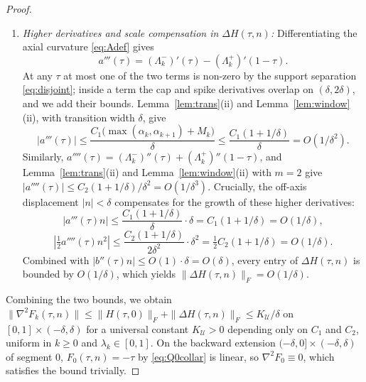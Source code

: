 \documentclass[11pt]{article}
\newcommand{\ip}[2]{\langle #1,#2\rangle}
\begin{document}
\begin{proof}
\begin{enumerate}
\[\]
everywhere on $[0, 1]$ (as $\alpha_{k+1}\le1$ by \eqref{eq:alphak}).
For the transverse tilt, since $g_k, g_{k+1}$, and $\nu_k$ are unit vectors, $|\ip{g_k}{\nu_k}|\le1$ and $|\ip{g_{k+1}}{\nu_k}|\le1$.
The transition in \eqref{eq:btrans} spans $[\delta, 1-\delta]$ of length $1-2\delta\ge9/10$, so by Lemma~\ref{lem:trans}(ii),
\[
|b'(\tau)| \le \frac{2C_1}{1-2\delta} \le \frac{20}{9}C_1 = O(1), \qquad
|b''(\tau)| \le \frac{2C_2}{(1-2\delta)^2} \le \frac{200}{81}C_2 = O(1).
\]
Consequently, the on-axis Hessian satisfies
\[
\|H(\tau, 0)\|_F \le \sqrt{2a''(\tau)^2 + 2b'(\tau)^2} \le \sqrt{2}/\delta + O(1) = O(1/\delta).
\]

\item \emph{Higher derivatives and scale compensation in $\Delta H(\tau, n)$:}
Differentiating the axial curvature \eqref{eq:Adef} gives
\[
a'''(\tau) = (\Lambda_k^-)'(\tau) - (\Lambda_k^+)'(1-\tau).
\]
At any $\tau$ at most one of the two terms is non-zero by the support separation \eqref{eq:disjoint}; inside a term the cap and spike derivatives overlap on $(\delta, 2\delta)$, and we add their bounds. Lemma~\ref{lem:trans}(ii) and Lemma~\ref{lem:window}(ii), with transition width $\delta$, give
\[
|a'''(\tau)| \le \frac{C_1\bigl(\max(\alpha_k,\alpha_{k+1})+M_k\bigr)}{\delta} \le \frac{C_1(1+1/\delta)}{\delta} = O(1/\delta^2).
\]
Similarly, $a''''(\tau) = (\Lambda_k^-)''(\tau) + (\Lambda_k^+)''(1-\tau)$, and Lemma~\ref{lem:trans}(ii) and Lemma~\ref{lem:window}(ii) with $m=2$ give $|a''''(\tau)| \le C_2(1+1/\delta)/\delta^2 = O(1/\delta^3)$.
Crucially, the off-axis displacement $|n| < \delta$ compensates for the growth of these higher derivatives:
\[
|a'''(\tau)n| \le \frac{C_1(1+1/\delta)}{\delta}\cdot\delta = C_1(1+1/\delta) = O(1/\delta),
\]
\[
|\tfrac12 a''''(\tau)n^2| \le \frac{C_2(1+1/\delta)}{2\delta^2}\cdot\delta^2 = \tfrac12 C_2(1+1/\delta) = O(1/\delta).
\]
Combined with $|b''(\tau)n| \le O(1)\cdot\delta = O(\delta)$, every entry of $\Delta H(\tau, n)$ is bounded by $O(1/\delta)$, which yields $\|\Delta H(\tau, n)\|_F = O(1/\delta)$.
\end{enumerate}
Combining the two bounds, we obtain $\|\nabla^2 F_k(\tau,n)\| \le \|H(\tau, 0)\|_F + \|\Delta H(\tau, n)\|_F \le K_{\mathcal U}/\delta$ on $[0,1]\times(-\delta,\delta)$ for a universal constant $K_{\mathcal U} > 0$ depending only on $C_1$ and $C_2$, uniform in $k\ge0$ and $\lambda_k\in[0,1]$.
On the backward extension $(-\delta,0]\times(-\delta,\delta)$ of segment $0$, $F_0(\tau,n)=-\tau$ by \eqref{eq:Q0collar} is linear, so $\nabla^2 F_0\equiv0$, which satisfies the bound trivially.
\end{proof}
\end{document}
